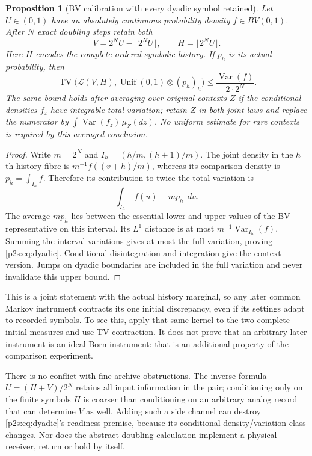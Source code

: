 \documentclass[11pt]{article}
\numberwithin{equation}{section}
\newtheorem{proposition}[theorem]{Proposition}
\theoremstyle{definition}
\theoremstyle{remark}
\newcommand{\TV}{\operatorname{TV}}
\begin{document}
\begin{proposition}[BV calibration with every dyadic symbol retained]
\label{p2s:prop:dyadic}
Let $U\in(0,1)$ have an absolutely continuous probability density
$f\in BV(0,1)$. After $N$ exact doubling steps retain both
\[
 V=2^NU-\lfloor2^NU\rfloor,\qquad H=\lfloor2^NU\rfloor.
\]
Here $H$ encodes the complete ordered symbolic history. If $p_h$ is its
actual probability, then
\begin{equation}\label{p2s:eq:dyadic}
 \TV\bigl(\mathcal L(V,H),\operatorname{Unif}(0,1)\otimes(p_h)_h\bigr)
 \leq \frac{\operatorname{Var}(f)}{2\cdot2^N}.
\end{equation}
The same bound holds after averaging over original contexts $Z$ if the
conditional densities $f_z$ have integrable total variation; retain $Z$
in both joint laws and replace the numerator by
$\int\operatorname{Var}(f_z)\,\mu_Z(dz)$. No uniform estimate for rare
contexts is required by this averaged conclusion.
\end{proposition}
\begin{proof}
Write $m=2^N$ and $I_h=(h/m,(h+1)/m)$. The joint density in the $h$th
history fibre is $m^{-1}f((v+h)/m)$, whereas its comparison density is
$p_h=\int_{I_h}f$. Therefore its contribution to twice the total variation
is
\[
 \int_{I_h}|f(u)-m p_h|\,du.
\]
The average $mp_h$ lies between the essential lower and upper values of
the BV representative on this interval. Its $L^1$ distance is at most
$m^{-1}\operatorname{Var}_{I_h}(f)$. Summing the interval variations gives
at most the full variation, proving \eqref{p2s:eq:dyadic}. Conditional
disintegration and integration give the context version. Jumps on dyadic
boundaries are included in the full variation and never invalidate this
upper bound.
\end{proof}

This is a joint statement with the actual history marginal, so any later
common Markov instrument contracts its one initial discrepancy, even if
its settings adapt to recorded symbols. To see this, apply that same
kernel to the two complete initial measures and use TV contraction.
It does not prove that an arbitrary later instrument is an ideal Born
instrument: that is an additional property of the comparison experiment.

There is no conflict with fine-archive obstructions. The inverse formula
$U=(H+V)/2^N$ retains all input information in the pair; conditioning only
on the finite symbols $H$ is coarser than conditioning on an arbitrary
analog record that can determine $V$ as well. Adding such a side channel
can destroy \eqref{p2s:eq:dyadic}'s readiness premise, because its
conditional density/variation class changes. Nor does the abstract doubling
calculation implement a physical receiver, return or hold by itself.
\end{document}
